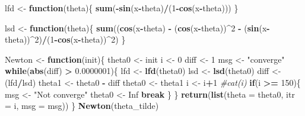 \documentclass[]{book}
\newenvironment{Shaded}{\begin{snugshade}}{\end{snugshade}}
\newcommand{\KeywordTok}[1]{\textcolor[rgb]{0.13,0.29,0.53}{\textbf{#1}}}
\newcommand{\DataTypeTok}[1]{\textcolor[rgb]{0.13,0.29,0.53}{#1}}
\newcommand{\DecValTok}[1]{\textcolor[rgb]{0.00,0.00,0.81}{#1}}
\newcommand{\FloatTok}[1]{\textcolor[rgb]{0.00,0.00,0.81}{#1}}
\newcommand{\StringTok}[1]{\textcolor[rgb]{0.31,0.60,0.02}{#1}}
\newcommand{\CommentTok}[1]{\textcolor[rgb]{0.56,0.35,0.01}{\textit{#1}}}
\newcommand{\OtherTok}[1]{\textcolor[rgb]{0.56,0.35,0.01}{#1}}
\newcommand{\ControlFlowTok}[1]{\textcolor[rgb]{0.13,0.29,0.53}{\textbf{#1}}}
\newcommand{\OperatorTok}[1]{\textcolor[rgb]{0.81,0.36,0.00}{\textbf{#1}}}
\newcommand{\NormalTok}[1]{#1}
\theoremstyle{definition}
\theoremstyle{definition}
\theoremstyle{definition}
\theoremstyle{remark}
\begin{document}
\begin{Shaded}
\begin{Highlighting}[]
\NormalTok{lfd <-}\StringTok{ }\ControlFlowTok{function}\NormalTok{(theta)\{}
  \KeywordTok{sum}\NormalTok{(}\OperatorTok{-}\KeywordTok{sin}\NormalTok{(x}\OperatorTok{-}\NormalTok{theta)}\OperatorTok{/}\NormalTok{(}\DecValTok{1}\OperatorTok{-}\KeywordTok{cos}\NormalTok{(x}\OperatorTok{-}\NormalTok{theta)))}
\NormalTok{\}}

\NormalTok{lsd <-}\StringTok{ }\ControlFlowTok{function}\NormalTok{(theta)\{}
  \KeywordTok{sum}\NormalTok{((}\KeywordTok{cos}\NormalTok{(x}\OperatorTok{-}\NormalTok{theta) }\OperatorTok{-}\StringTok{ }\NormalTok{(}\KeywordTok{cos}\NormalTok{(x}\OperatorTok{-}\NormalTok{theta))}\OperatorTok{^}\DecValTok{2} \OperatorTok{-}\StringTok{ }\NormalTok{(}\KeywordTok{sin}\NormalTok{(x}\OperatorTok{-}\NormalTok{theta))}\OperatorTok{^}\DecValTok{2}\NormalTok{)}\OperatorTok{/}\NormalTok{(}\DecValTok{1}\OperatorTok{-}\KeywordTok{cos}\NormalTok{(x}\OperatorTok{-}\NormalTok{theta))}\OperatorTok{^}\DecValTok{2}\NormalTok{)}
\NormalTok{\}}

\NormalTok{Newton <-}\StringTok{ }\ControlFlowTok{function}\NormalTok{(init)\{}
\NormalTok{  theta0 <-}\StringTok{ }\NormalTok{init}
\NormalTok{  i <-}\StringTok{ }\DecValTok{0}
\NormalTok{  diff <-}\StringTok{ }\DecValTok{1}
\NormalTok{  msg <-}\StringTok{ "converge"}
  \ControlFlowTok{while}\NormalTok{(}\KeywordTok{abs}\NormalTok{(diff) }\OperatorTok{>}\StringTok{ }\FloatTok{0.0000001}\NormalTok{)\{}
\NormalTok{    lfd <-}\StringTok{ }\KeywordTok{lfd}\NormalTok{(theta0)}
\NormalTok{    lsd <-}\StringTok{ }\KeywordTok{lsd}\NormalTok{(theta0)}
\NormalTok{    diff <-}\StringTok{ }\NormalTok{(lfd}\OperatorTok{/}\NormalTok{lsd)}
\NormalTok{    theta1 <-}\StringTok{ }\NormalTok{theta0 }\OperatorTok{-}\StringTok{ }\NormalTok{diff}
\NormalTok{    theta0 <-}\StringTok{ }\NormalTok{theta1}
\NormalTok{    i <-}\StringTok{ }\NormalTok{i}\OperatorTok{+}\DecValTok{1}
    \CommentTok{#cat(i)}
    \ControlFlowTok{if}\NormalTok{(i }\OperatorTok{>=}\StringTok{ }\DecValTok{150}\NormalTok{)\{}
\NormalTok{      msg <-}\StringTok{ "Not converge"}
\NormalTok{      theta0 <-}\StringTok{ }\OtherTok{Inf}
      \ControlFlowTok{break}
\NormalTok{    \}}
\NormalTok{  \}}
  \KeywordTok{return}\NormalTok{(}\KeywordTok{list}\NormalTok{(}\DataTypeTok{theta =}\NormalTok{ theta0, }\DataTypeTok{itr =}\NormalTok{ i, }\DataTypeTok{msg =}\NormalTok{ msg))}
\NormalTok{\}}
\KeywordTok{Newton}\NormalTok{(theta_tilde)}
\end{Highlighting}
\end{Shaded}
\end{document}
